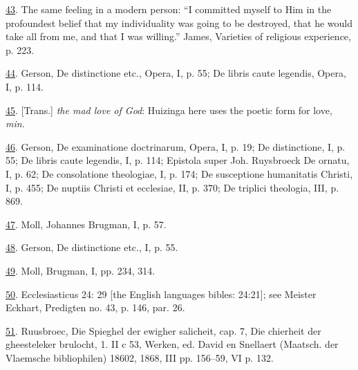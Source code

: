 \protect\hypertarget{23_NOTES.xhtmlux5cux23id_823}{\protect\hyperlink{15_Chapter_Eight__RELIGIOUS_EXCITAT.xhtmlux5cux23id_822}{43}}.
The same feeling in a modern person: ``I committed myself to Him in the
profoundest belief that my individuality was going to be destroyed, that
he would take all from me, and that I was willing.'' James, Varieties of
religious experience, p. 223.

\protect\hypertarget{23_NOTES.xhtmlux5cux23id_821}{\protect\hyperlink{15_Chapter_Eight__RELIGIOUS_EXCITAT.xhtmlux5cux23id_820}{44}}.
Gerson, De distinctione etc., Opera, I, p. 55; De libris caute legendis,
Opera, I, p. 114.

\protect\hypertarget{23_NOTES.xhtmlux5cux23id_819}{\protect\hyperlink{15_Chapter_Eight__RELIGIOUS_EXCITAT.xhtmlux5cux23id_818}{45}}.
{[}Trans.{]} \emph{the mad love of God}: Huizinga here uses the poetic
form for love, \emph{min}.

\protect\hypertarget{23_NOTES.xhtmlux5cux23id_817}{\protect\hyperlink{15_Chapter_Eight__RELIGIOUS_EXCITAT.xhtmlux5cux23id_816}{46}}.
Gerson, De examinatione doctrinarum, Opera, I, p. 19; De distinctione,
I, p. 55; De libris caute legendis, I, p. 114; Epistola super Joh.
Ruysbroeck De ornatu, I, p. 62; De consolatione theologiae, I, p. 174;
De susceptione humanitatis Christi, I, p. 455; De nuptiis Christi et
ecclesiae, II, p. 370; De triplici theologia, III, p. 869.

\protect\hypertarget{23_NOTES.xhtmlux5cux23id_815}{\protect\hyperlink{15_Chapter_Eight__RELIGIOUS_EXCITAT.xhtmlux5cux23id_814}{47}}.
Moll, Johannes Brugman, I, p. 57.

\protect\hypertarget{23_NOTES.xhtmlux5cux23id_813}{\protect\hyperlink{15_Chapter_Eight__RELIGIOUS_EXCITAT.xhtmlux5cux23id_812}{48}}.
Gerson, De distinctione etc., I, p. 55.

\protect\hypertarget{23_NOTES.xhtmlux5cux23id_811}{\protect\hyperlink{15_Chapter_Eight__RELIGIOUS_EXCITAT.xhtmlux5cux23id_810}{49}}.
Moll, Brugman, I, pp. 234, 314.

\protect\hypertarget{23_NOTES.xhtmlux5cux23id_809}{\protect\hyperlink{15_Chapter_Eight__RELIGIOUS_EXCITAT.xhtmlux5cux23id_808}{50}}.
Ecclesiasticus 24: 29 {[}the English languages bibles: 24:21{]}; see
Meister Eckhart, Predigten no. 43, p. 146, par. 26.

\protect\hypertarget{23_NOTES.xhtmlux5cux23id_807}{\protect\hyperlink{15_Chapter_Eight__RELIGIOUS_EXCITAT.xhtmlux5cux23id_806}{51}}.
Ruusbroec, Die Spieghel der ewigher salicheit, cap. 7, Die chierheit der
gheesteleker brulocht, 1. II c 53, Werken, ed. David en Snellaert
(Maatsch. der Vlaemsche bibliophilen) 18602, 1868, III pp. 156--59, VI
p. 132.

